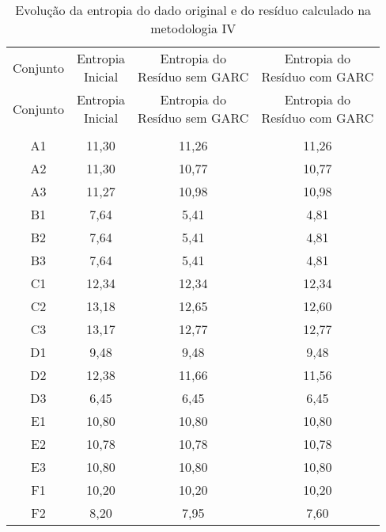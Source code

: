 \begin{center}
\begin{longtable}{cccc}
\toprule
\rowcolor{white}
\caption[Metodologia IV: evolução da entropia]{Evolução da entropia do dado
original e do resíduo calculado na metodologia IV}
\label{tab:EvolucaoEntropiaMet4}\\
\midrule
Conjunto & \specialcell{Entropia \\Inicial} & \specialcell{Entropia do
\\Resíduo sem GARC} & \specialcell{Entropia do
\\Resíduo com GARC}  \\
\midrule
\endfirsthead
\midrule
\rowcolor{white}
Conjunto & \specialcell{Entropia \\Inicial} & \specialcell{Entropia do
\\Resíduo sem GARC} & \specialcell{Entropia do
\\Resíduo com GARC}  \\
\toprule
\endhead
\midrule \\ %
\endfoot
\bottomrule 
\endlastfoot
    A1    & 11,30 & 11,26 & 11,26 \\
    A2    & 11,30 & 10,77 & 10,77 \\
    A3    & 11,27 & 10,98 & 10,98 \\
    B1    & 7,64  & 5,41  & 4,81 \\
    B2    & 7,64  & 5,41  & 4,81 \\
    B3    & 7,64  & 5,41  & 4,81 \\
    C1    & 12,34 & 12,34 & 12,34 \\
    C2    & 13,18 & 12,65 & 12,60 \\
    C3    & 13,17 & 12,77 & 12,77 \\
    D1    & 9,48  & 9,48  & 9,48 \\
    D2    & 12,38 & 11,66 & 11,56 \\
    D3    & 6,45  & 6,45  & 6,45 \\
    E1    & 10,80 & 10,80 & 10,80 \\
    E2    & 10,78 & 10,78 & 10,78 \\
    E3    & 10,80 & 10,80 & 10,80 \\
    F1    & 10,20 & 10,20 & 10,20 \\
    F2    & 8,20  & 7,95  & 7,60 \\

\end{longtable}
\end{center}
